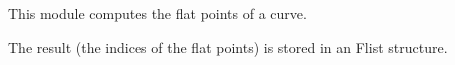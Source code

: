 This module computes the flat points of a curve. 

\medskip
The result (the indices of the flat points) is stored in an Flist structure.